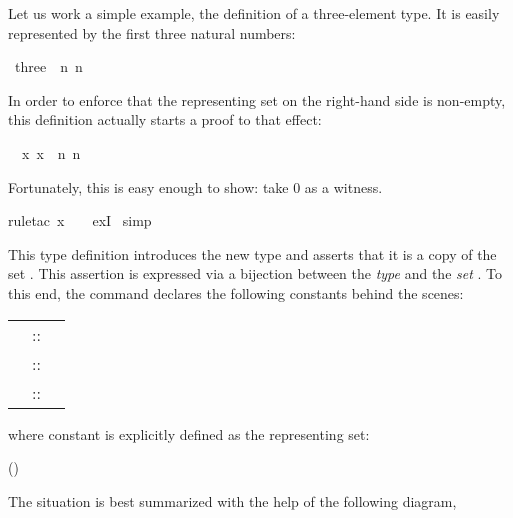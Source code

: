 \begin{isabellebody}
\begin{isamarkuptext}
Let us work a simple example, the definition of a three-element type.
It is easily represented by the first three natural numbers:%
\end{isamarkuptext}%
\ three\ {\isacharequal}\ {\isachardoublequote}{\isacharbraceleft}n{\isachardot}\ n\ {\isasymle}\ {}{\isacharbraceright}{\isachardoublequote}%
\begin{isamarkuptxt}%
\noindent{}%
In order to enforce that the representing set on the right-hand side is
non-empty, this definition actually starts a proof to that effect:
\begin{isabelle}%
\ {}{\isachardot}\ {\isasymexists}x{\isachardot}\ x\ {\isasymin}\ {\isacharbraceleft}n{\isachardot}\ n\ {\isasymle}\ {}{\isacharbraceright}%
\end{isabelle}
Fortunately, this is easy enough to show: take 0 as a witness.%
\end{isamarkuptxt}%
rule{\isacharunderscore}tac\ x\ {\isacharequal}\ {}\ \ exI{\isacharparenright}\isanewline
{}\ simp%
\begin{isamarkuptext}%
This type definition introduces the new type  and asserts
that it is a copy of the set . This assertion
is expressed via a bijection between the \emph{type}  and the
\emph{set} . To this end, the command declares the following
constants behind the scenes:
\begin{center}
\begin{tabular}{rcl}
\isa{three} &::& \isa{nat\ set} \\
\isa{Rep{\isacharunderscore}three} &::& \isa{three\ {\isasymRightarrow}\ nat}\\
\isa{Abs{\isacharunderscore}three} &::& \isa{nat\ {\isasymRightarrow}\ three}
\end{tabular}
\end{center}
where constant  is explicitly defined as the representing set:
\begin{center}
\hfill()
\end{center}
The situation is best summarized with the help of the following diagram,

\end{isamarkuptext}
\end{isabellebody}

